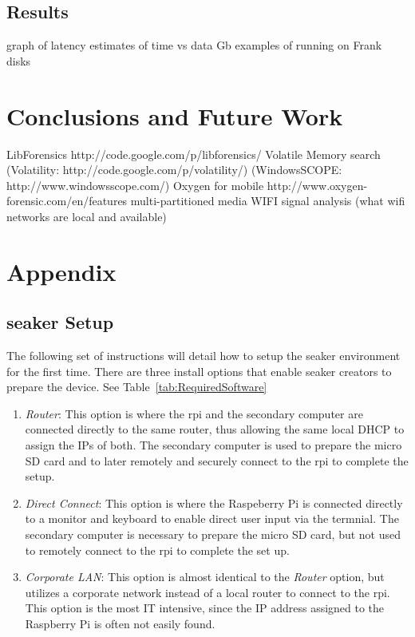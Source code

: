 \documentclass[12pt]{article}
\begin{document}
\subsection{Results}
graph of latency
estimates of time vs data Gb
examples of running on Frank disks


\section{Conclusions and Future Work}
\label{sect-conclusionAndFutureWork}
LibForensics http://code.google.com/p/libforensics/
Volatile Memory search (Volatility: http://code.google.com/p/volatility/)
  (WindowsSCOPE: http://www.windowsscope.com/)
Oxygen for mobile http://www.oxygen-forensic.com/en/features
multi-partitioned media
WIFI signal analysis (what wifi networks are local and available)


\section{Appendix}
\label{sect-Appendix}

\subsection{\gls{seaker} Setup}
The following set of instructions will detail how to setup the \gls{seaker}
environment for the first time. There are three install options that
enable \gls{seaker} creators to prepare the device.  See
Table~\ref{tab:RequiredSoftware}

\begin{enumerate}
  \item {\em Router}: This option is where the \gls{rpi} and the
  secondary computer are connected directly to the same router, thus
  allowing the same local DHCP to assign the IPs of both.  The
  secondary computer is used to prepare the micro SD card and to later
  remotely and securely connect to the \gls{rpi} to complete the
  setup.
  
  \item {\em Direct Connect}: This option is where the Raspeberry Pi
  is connected directly to a monitor and keyboard to enable direct
  user input via the termnial.  The secondary computer is necessary to
  prepare the micro SD card, but not used to remotely connect to the
  \gls{rpi} to complete the set up.

  \item {\em Corporate LAN}: This option is almost identical to the
  {\em Router} option, but utilizes a corporate network instead of
  a local router to connect to the \gls{rpi}.  This option is the
  most IT intensive, since the IP address assigned to the Raspberry
  Pi is often not easily found.
\end{enumerate}
\end{document}

